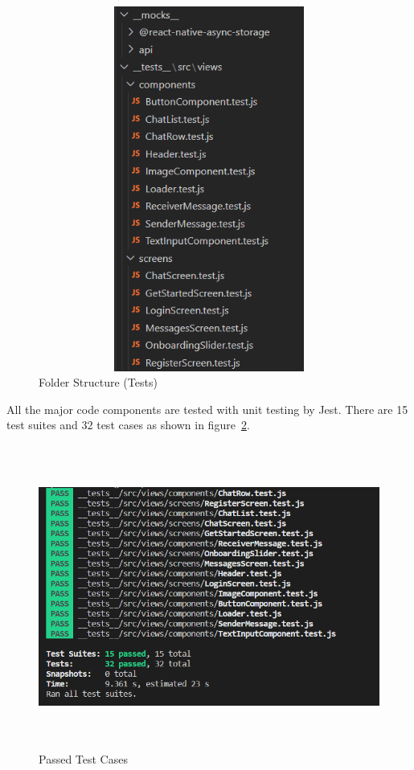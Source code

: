 \begin{figure}[H]
	\centering
	\includegraphics[width=1\textwidth,width=6cm, height=12cm]{images/testing_code_tree.png}
	\caption{Folder Structure (Tests)}
	\label{fig:codebase_test}
\end{figure}

All the major code components are tested with unit testing by Jest. There are 15 test suites and 32 test cases as shown in figure~\ref{fig:passed_Tests}.

\begin{figure}[H]
	\centering
	\includegraphics[width=1\textwidth,width=14cm, height=10cm]{images/test_passing.png}
	\caption{Passed Test Cases}
	\label{fig:passed_Tests}
\end{figure}

